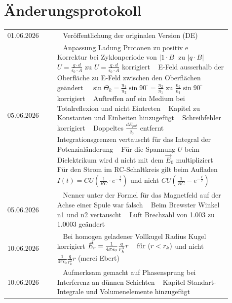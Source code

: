 \begin{minipage}{\columnwidth}
	\section{Änderungsprotokoll}
\begin{tabular}{p{0.2\linewidth} | p{0.7\linewidth}}
	01.06.2026 & \textbullet~ Veröffentlichung der originalen Version (DE) \\[1.5ex]
	05.06.2026 & \textbullet~ Anpassung Ladung Protonen zu positiv e \newline 
	\textbullet~ Korrektur bei Zyklonperiode von $|1 \cdot B|$ zu $|q \cdot B|$ \newline
	\textbullet~ $U = \frac{g \cdot d}{\epsilon_0 \cdot A}$ zu $U = \frac{q \cdot d}{\epsilon_0 \cdot A}$ korrigiert \newline
	\textbullet~ E-Feld ausserhalb der Oberfläche zu E-Feld zwischen den Oberflächen geändert \newline
	\textbullet~ $\sin{\Theta_k} = \frac{n_1}{n_2}\sin{90^{\circ}} = \frac{n_2}{n_1}$ zu $\frac{n_2}{n_1}\sin{90^{\circ}}$ korrigiert \newline
	\textbullet~ Auftreffen auf ein Medium bei Totalreflexion und nicht Eintreten \newline
	\textbullet~ Kapitel zu Konstanten und Einheiten hinzugefügt \newline
	\textbullet~ Schreibfehler korrigiert \newline
	\textbullet~ Doppeltes $\frac{dE_{pot}}{q_0}$ entfernt \newline
	\textbullet~ Integrationsgrenzen vertauscht für das Integral der Potenzialänderung \newline
	\textbullet~ Für die Spannung $U$ beim Dielektrikum wird d nicht mit dem $\Vec{E}_0$ multipliziert \newline
	\textbullet~ Für den Strom im RC-Schaltkreis gilt beim Aufladen $I(t) = CU \left( \frac{1}{RC} \cdot e^{-\frac{t}{\tau}}  \right)$ und nicht $CU \left( \frac{1}{RC} - e^{-\frac{t}{\tau}}  \right)$ \\[1.5ex]
	05.06.2026 & \textbullet~ Nenner unter der Formel für das Magnetfeld auf der Achse einer Spule war falsch \newline 
	\textbullet~ Beim Brewster Winkel n1 und n2 vertauscht \newline
	\textbullet~ Luft Brechzahl von 1.003 zu 1.0003 geändert \\[1.5ex]
	10.06.2026 & \textbullet~ Bei homogen geladener Vollkugel Radius Kugel korrigiert $\Vec{E}_r = \frac{1}{4\pi\epsilon_0}\frac{q}{r_k^3}r \hspace{3mm} \text{ für } (r < r_k)$ und nicht $\frac{1}{4\pi\epsilon_0}\frac{q}{r_k^2}r$ (merci Ebert) \\[1.5ex]
	10.06.2026 & \textbullet~ Aufmerksam gemacht auf Phasensprung bei Interferenz an dünnen Schichten \newline
	\textbullet~ Kapitel Standart-Integrale und Volumenelemente hinzugefügt \newline
	
\end{tabular}
\end{minipage}
